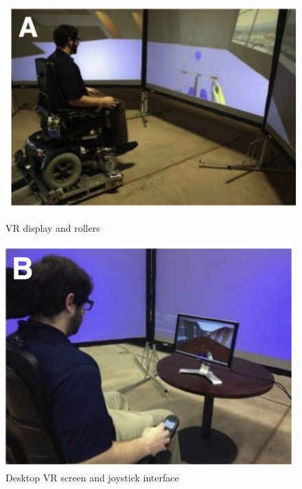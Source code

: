 \begin{figure}[!htbp]
\center
\begin{minipage}{0.495\linewidth}
\center
\captionsetup{justification=centering,margin=0.5cm,font=small}
\includegraphics[width=1\linewidth]{img/cap3/kamaraj2016-InterfacesA}
\caption{VR display and rollers \cite{kamaraj2016}} \label{fig:kamaraj2016-InterfacesA}
\end{minipage}
\begin{minipage}{0.495\linewidth}
\center
\captionsetup{justification=centering,margin=0cm,font=small}
\includegraphics[width=0.92\linewidth]{img/cap3/kamaraj2016-InterfacesB}
\caption{Desktop VR screen and joystick interface \cite{kamaraj2016}} \label{fig:kamaraj2016-InterfacesB}
\end{minipage}
\begin{minipage}{0.495\linewidth}

\end{minipage}
\end{figure}
